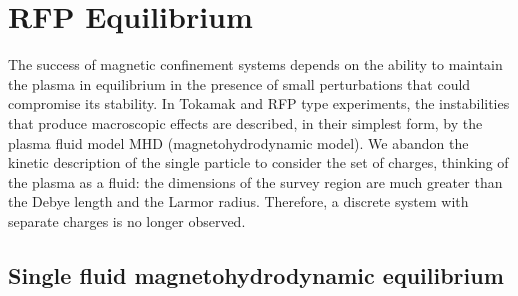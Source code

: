 \chapter{RFP Equilibrium}
\label{section:2_equilibrium}

The success of magnetic confinement systems depends on the ability to maintain the plasma in equilibrium in the presence of small perturbations
that could compromise its stability. In Tokamak and RFP type experiments, the instabilities that produce macroscopic effects are described, in their simplest form, by the plasma fluid model MHD (magnetohydrodynamic model). 
We abandon the kinetic description of the single particle to consider the set of charges, thinking of the plasma as a fluid: the dimensions of the survey region are much greater than the Debye length and the Larmor radius. Therefore, a discrete system with separate charges is no longer observed.



\section{Single fluid magnetohydrodynamic equilibrium}


